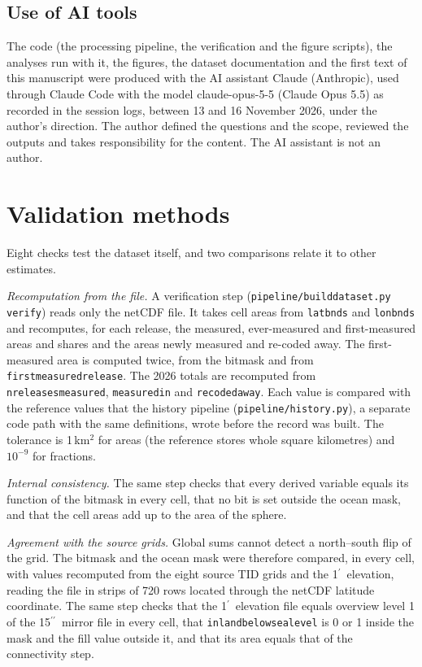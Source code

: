 \documentclass[essd, manuscript]{copernicus}
\newcommand{\as}{$^{\prime\prime}$}      %
\newcommand{\am}{$^{\prime}$}            %
\renewcommand{\_}{\usorig\allowbreak}
\begin{document}
\subsection{Use of AI tools}
\label{sec:ai}

The code (the processing pipeline, the verification and the figure scripts), the analyses run with it, the figures, the dataset documentation and the first text of this manuscript were produced with the AI assistant Claude (Anthropic), used through Claude Code with the model claude-opus-5-5 (Claude Opus 5.5) as recorded in the session logs, between 13 and 16 November 2026, under the author's direction.
The author defined the questions and the scope, reviewed the outputs and takes responsibility for the content.
The AI assistant is not an author.

\section{Validation methods}
\label{sec:valmethods}

Eight checks test the dataset itself, and two comparisons relate it to other estimates.

\textit{Recomputation from the file.} A verification step (\texttt{pipeline/build\_dataset.py verify}) reads only the netCDF file.
It takes cell areas from \texttt{lat\_bnds} and \texttt{lon\_bnds} and recomputes, for each release, the measured, ever-measured and first-measured areas and shares and the areas newly measured and re-coded away.
The first-measured area is computed twice, from the bitmask and from \texttt{first\_measured\_release}.
The 2026 totals are recomputed from \texttt{n\_releases\_measured}, \texttt{measured\_in\_2026} and \texttt{recoded\_away}.
Each value is compared with the reference values that the history pipeline (\texttt{pipeline/history.py}), a separate code path with the same definitions, wrote before the record was built.
The tolerance is 1\,km$^2$ for areas (the reference stores whole square kilometres) and $10^{-9}$ for fractions.

\textit{Internal consistency.} The same step checks that every derived variable equals its function of the bitmask in every cell, that no bit is set outside the ocean mask, and that the cell areas add up to the area of the sphere.

\textit{Agreement with the source grids.} Global sums cannot detect a north--south flip of the grid.
The bitmask and the ocean mask were therefore compared, in every cell, with values recomputed from the eight source TID grids and the 1\am\ elevation, reading the file in strips of 720 rows located through the netCDF latitude coordinate.
The same step checks that the 1\am\ elevation file equals overview level 1 of the 15\as\ mirror file in every cell, that \texttt{inland\_below\_sea\_level} is 0 or 1 inside the mask and the fill value outside it, and that its area equals that of the connectivity step.
\end{document}
